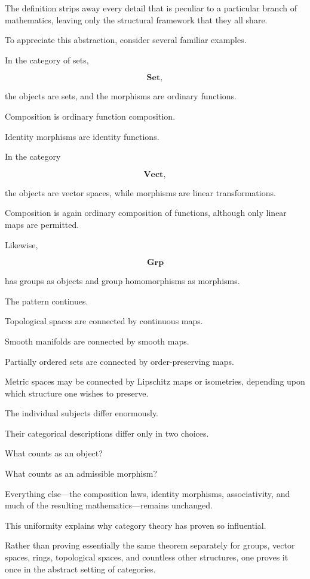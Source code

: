 \documentclass[11pt]{book}
\numberwithin{equation}{chapter}
\theoremstyle{definition}
\theoremstyle{plain}
\theoremstyle{remark}
\begin{document}
The definition strips away every detail that is peculiar to a particular branch of mathematics, leaving only the structural framework that they all share.

To appreciate this abstraction, consider several familiar examples.

In the category of sets,

\[
\mathbf{Set},
\]

the objects are sets, and the morphisms are ordinary functions.

Composition is ordinary function composition.

Identity morphisms are identity functions.

In the category

\[
\mathbf{Vect},
\]

the objects are vector spaces, while morphisms are linear transformations.

Composition is again ordinary composition of functions, although only linear maps are permitted.

Likewise,

\[
\mathbf{Grp}
\]

has groups as objects and group homomorphisms as morphisms.

The pattern continues.

Topological spaces are connected by continuous maps.

Smooth manifolds are connected by smooth maps.

Partially ordered sets are connected by order-preserving maps.

Metric spaces may be connected by Lipschitz maps or isometries, depending upon which structure one wishes to preserve.

The individual subjects differ enormously.

Their categorical descriptions differ only in two choices.

What counts as an object?

What counts as an admissible morphism?

Everything else—the composition laws, identity morphisms, associativity, and much of the resulting mathematics—remains unchanged.

This uniformity explains why category theory has proven so influential.

Rather than proving essentially the same theorem separately for groups, vector spaces, rings, topological spaces, and countless other structures, one proves it once in the abstract setting of categories.
\end{document}
